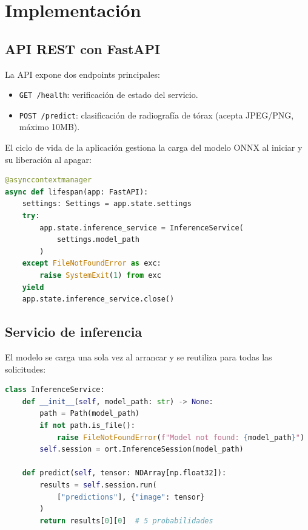 \section{Implementaci\'on}
\label{sec:implementation}

\subsection{API REST con FastAPI}

La API expone dos endpoints principales:

\begin{itemize}
    \item \texttt{GET /health}: verificaci\'on de estado del servicio.
    \item \texttt{POST /predict}: clasificaci\'on de radiograf\'ia de t\'orax (acepta JPEG/PNG, m\'aximo 10MB).
\end{itemize}

El ciclo de vida de la aplicaci\'on gestiona la carga del modelo ONNX al iniciar y su liberaci\'on al apagar:

\begin{lstlisting}[language=Python, caption={Lifespan del modelo ONNX en FastAPI.}]
@asynccontextmanager
async def lifespan(app: FastAPI):
    settings: Settings = app.state.settings
    try:
        app.state.inference_service = InferenceService(
            settings.model_path
        )
    except FileNotFoundError as exc:
        raise SystemExit(1) from exc
    yield
    app.state.inference_service.close()
\end{lstlisting}

\subsection{Servicio de inferencia}

El modelo se carga una sola vez al arrancar y se reutiliza para todas las solicitudes:

\begin{lstlisting}[language=Python, caption={InferenceService con ONNX Runtime.}]
class InferenceService:
    def __init__(self, model_path: str) -> None:
        path = Path(model_path)
        if not path.is_file():
            raise FileNotFoundError(f"Model not found: {model_path}")
        self.session = ort.InferenceSession(model_path)

    def predict(self, tensor: NDArray[np.float32]):
        results = self.session.run(
            ["predictions"], {"image": tensor}
        )
        return results[0][0]  # 5 probabilidades
\end{lstlisting}

